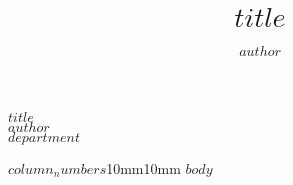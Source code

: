 \documentclass[article,$font_size$,extrafontsizes]{memoir}
\author{$author$}
\title{$title$}
\begin{document}
\begin{mdframed}[style=brentsmdfstyle]
\renewcommand\footnoterule{}
\renewcommand{\thempfootnote}{\footnotesize\color{red}{\arabic{mpfootnote}}}

\begingroup
  \centering
  \color{$title_textcol$}
\vspace{0.5in}
  \Huge{$title$} \\[0.3in]
  \color{cyan} \Large{$author$} \\[0.2in]
  \color{white} \large{$department$} \par
  \vspace{0.2in}

  \endgroup
\end{mdframed}

\begin{adjmulticols*}{$column_numbers$}{10mm}{10mm}
\normalsize{
\color{black}
$body$
\printbibliography
}
\end{adjmulticols*}
\end{document}
